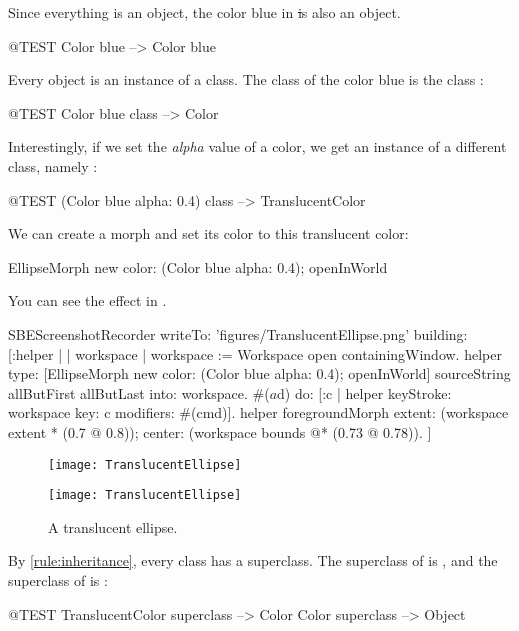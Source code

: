 \documentclass[a4paper,10pt,twoside]{book}
\begin{document}
Since everything is an object, the color blue in \st is also an object.
\begin{code}{@TEST}
Color blue --> Color blue
\end{code}

\noindent
Every object is an instance of a class. The class of the color blue is the class :
\begin{code}{@TEST}
Color blue class --> Color
\end{code}

\noindent
Interestingly, if we set the \emph{alpha} value of a color, we get an instance of a different class, namely :
\begin{code}{@TEST}
(Color blue alpha: 0.4) class --> TranslucentColor
\end{code}

\noindent
We can create a morph and set its color to this translucent color:
\begin{code}{}
EllipseMorph new color: (Color blue alpha: 0.4); openInWorld
\end{code}
\noindent
You can see the effect in .

\begin{ExecuteSmalltalkScript}
SBEScreenshotRecorder writeTo: 'figures/TranslucentEllipse.png' building: [:helper |
	| workspace |
	workspace := Workspace open containingWindow.
	helper
		type: [EllipseMorph new
			color: (Color blue alpha: 0.4);
			openInWorld]
				sourceString allButFirst allButLast
		into: workspace.
	#($a $d) do: [:c | helper keyStroke: workspace key: c modifiers: #(cmd)].
	helper foregroundMorph
		extent: (workspace extent * (0.7 @ 0.8));
		center: (workspace bounds @* (0.73 @ 0.78)).
]
\end{ExecuteSmalltalkScript}
\begin{center}
\begin{figure}[!ht]
\ifluluelse
	{\centerline {\texttt{[image: TranslucentEllipse]}}}
	{\centerline {\texttt{[image: TranslucentEllipse]}}}
\caption{A translucent ellipse.\label{fig:translucentEllipse}}
\end{figure}
\end{center}

By \ref{rule:inheritance}, every class has a superclass.
The superclass of  is , and the superclass of  is :
\begin{code}{@TEST}
TranslucentColor superclass --> Color
Color superclass                   --> Object
\end{code}
\end{document}
